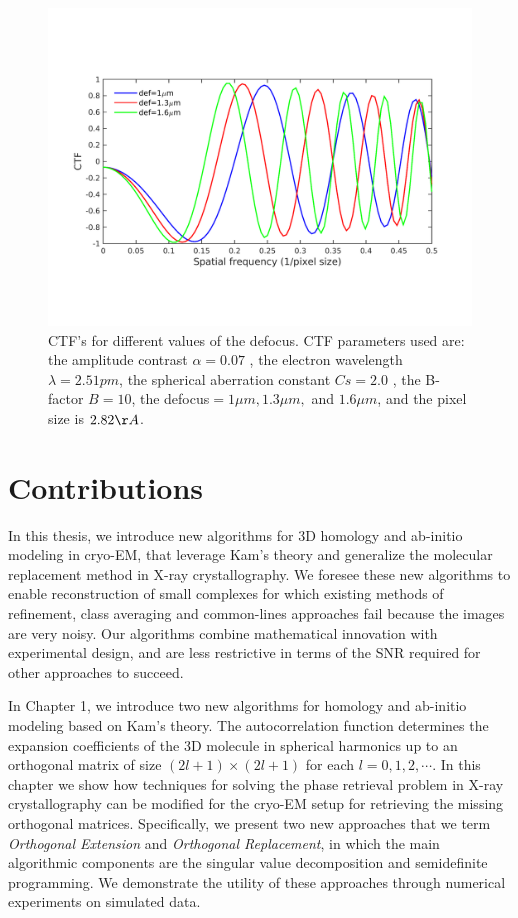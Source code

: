 \begin{figure}
\begin{center}
\includegraphics[width=.99\columnwidth]{figures/ctfeg_fig.png}
\caption{CTF's for different values of the defocus. CTF parameters used are: the amplitude contrast $\alpha = 0.07$
, the electron wavelength $\lambda= 2.51pm$, the spherical aberration constant $Cs=2.0$
, the B-factor $B=10$, the defocus$=1\mu m, 1.3\mu m,$ and
$1.6\mu m$, and the pixel size is $2.82\AA$.}\label{fig:ctf_intro}
\end{center}
\end{figure}


\section{Contributions}
In this thesis, we introduce new algorithms for 3D homology and ab-initio modeling in cryo-EM, that leverage Kam's theory and generalize the molecular replacement method in X-ray crystallography. We foresee these new algorithms to enable reconstruction of small complexes for which existing methods of refinement, class averaging and common-lines approaches fail because the images are very noisy. Our algorithms combine mathematical innovation with experimental design, and are less restrictive in terms of the SNR required for other approaches to succeed. 

In Chapter 1, we introduce two new algorithms for homology and ab-initio modeling based on Kam's theory. The autocorrelation function determines the expansion coefficients of the 3D molecule in spherical harmonics up to an orthogonal matrix of size $(2l+1)\times (2l+1)$ for each $l=0,1,2,\cdots$. In this chapter we show how techniques for solving the phase retrieval problem in X-ray crystallography can be modified for the cryo-EM setup for retrieving the missing orthogonal matrices. Specifically, we present two new approaches that we term {\em Orthogonal Extension} and {\em Orthogonal Replacement}, in which the main algorithmic components are the singular value decomposition and semidefinite programming. We demonstrate the utility of these approaches through numerical experiments on simulated data.

